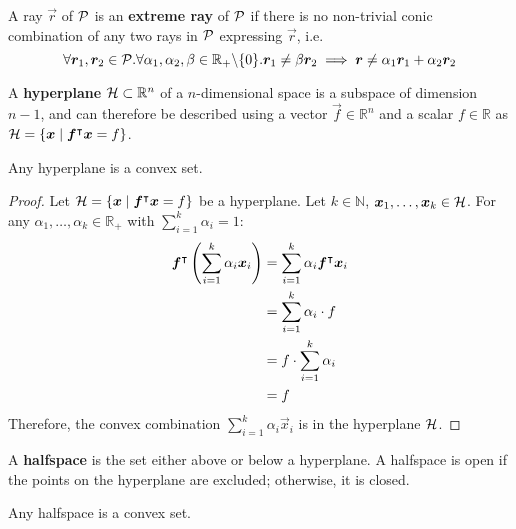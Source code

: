\begin{definition}
A ray $\vec{r}$ of $\mathcal{P}$ is an \textbf{extreme ray} of $\mathcal{P}$ if there is no non-trivial conic combination of any two rays in $\mathcal{P}$ expressing $\vec{r}$, i.e.
\begin{equation*}
\forall {\bm{r}}_1, {\bm{r}}_2 \in \mathcal{P}. \forall \alpha_1, \alpha_2, \beta \in \mathbb{R}_+ \backslash \{0\}. {\bm{r}}_1 \neq \beta {\bm{r}}_2 \implies {\bm{r}} \neq \alpha_1 {\bm{r}}_1 + \alpha_2 {\bm{r}}_2
\end{equation*}
\end{definition}

\begin{definition}
A \textbf{hyperplane} $\mathcal{H} \subset \mathbb{R}^n$ of a $n$-dimensional space is a subspace of dimension $n-1$, and can therefore be described using a vector $\vec{f} \in \mathbb{R}^n$ and a scalar $f \in \mathbb{R}$ as $\mathcal{H} = \{{\bm{x}} \mid {\bm{f}}^\intercal {\bm{x}} = f\}$.
\end{definition}

\begin{corollary}
Any hyperplane is a convex set.
\end{corollary}

\begin{proof}
Let $\mathcal{H} = \{{\bm{x}} \mid {\bm{f}}^\intercal {\bm{x}} = f\}$ be a hyperplane. Let $k \in \mathbb{N}$, ${\bm{x}}_1, \dots, {\bm{x}}_k \in \mathcal{H}$. For any $\alpha_1, \dots, \alpha_k \in \mathbb{R}_+$ with $\sum_{i=1}^{k} \alpha_i = 1$:
\begin{align*}
{\bm{f}}^\intercal \left( \sum_{i=1}^{k} \alpha_i {\bm{x}}_i \right)
&= \sum_{i=1}^{k} \alpha_i {\bm{f}}^\intercal {\bm{x}}_i \\
&= \sum_{i=1}^{k} \alpha_i \cdot f \\
&= f \cdot \sum_{i=1}^{k} \alpha_i \\
&= f
\end{align*}
Therefore, the convex combination $\sum_{i=1}^{k} \alpha_i \vec{x}_i$ is in the hyperplane $\mathcal{H}$.
\end{proof}

\begin{definition}
A \textbf{halfspace} is the set either above or below a hyperplane. A halfspace is open if the points on the hyperplane are excluded; otherwise, it is closed.
\end{definition}

\begin{corollary}\label{cor:halfspace_convex}
Any halfspace is a convex set.
\end{corollary}

